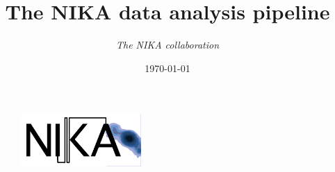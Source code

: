 \documentclass[a4paper]{article}
\title{\bf The NIKA data analysis pipeline}           %
\author{{\it The NIKA collaboration}}
\date{\today}
\begin{document}
\maketitle                    %
\begin{figure}[!h]
\centering
\includegraphics[height=2cm,trim=0cm 0.1cm 0.1cm 0.1cm, clip=true]{Figure/nika_white_bg}
\end{figure}
\vspace*{0.5cm}

\setcounter{page}{1}
\setcounter{tocdepth}{1}
\end{document}
